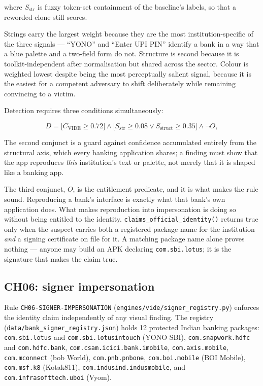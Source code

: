 \documentclass{article}
\begin{document}
where $S_{\mathrm{str}}$ is fuzzy token-set containment of the baseline's
labels, so that a reworded clone still scores.

Strings carry the largest weight because they are the most institution-specific
of the three signals --- ``YONO'' and ``Enter UPI PIN'' identify a bank in a way
that a blue palette and a two-field form do not. Structure is second because it
is toolkit-independent after normalisation but shared across the sector. Colour
is weighted lowest despite being the most perceptually salient signal, because
it is the easiest for a competent adversary to shift deliberately while
remaining convincing to a victim.

Detection requires three conditions simultaneously:

\begin{equation}
D = \big[C_{\mathrm{VIDE}} \ge 0.72\big] \wedge
    \big[S_{\mathrm{str}} \ge 0.08 \vee S_{\mathrm{struct}} \ge 0.35\big] \wedge
    \neg O,
\label{eq:vide-detect}
\end{equation}

The second conjunct is a guard against confidence accumulated entirely from the
structural axis, which every banking application shares; a finding must show
that the app reproduces \emph{this} institution's text or palette, not merely
that it is shaped like a banking app.

The third conjunct, $O$, is the entitlement predicate, and it is what makes the
rule sound. Reproducing a bank's interface is exactly what that bank's own
application does. What makes reproduction into impersonation is doing so without
being entitled to the identity. \texttt{claims\_official\_identity()} returns
true only when the suspect carries both a registered package name for the
institution \emph{and} a signing certificate on file for it. A matching package
name alone proves nothing --- anyone may build an APK declaring
\texttt{com.sbi.lotus}; it is the signature that makes the claim true.

\subsection{CH06: signer impersonation}
\label{ssec:ch06}

Rule \texttt{CH06-SIGNER-IMPERSONATION}
(\texttt{engines/vide/signer\_registry.py}) enforces the identity claim
independently of any visual finding. The registry
(\texttt{data/bank\_signer\_registry.json}) holds 12 protected Indian banking
packages: \texttt{com.sbi.lotus} and \texttt{com.sbi.lotusintouch} (YONO SBI),
\texttt{com.snapwork.hdfc} and \texttt{com.hdfc.bank},
\texttt{com.csam.icici.bank.imobile}, \texttt{com.axis.mobile},
\texttt{com.mconnect} (bob World), \texttt{com.pnb.pnbone},
\texttt{com.boi.mobile} (BOI Mobile), \texttt{com.msf.k8} (Kotak811),
\texttt{com.indusind.indusmobile}, and \texttt{com.infrasofttech.uboi} (Vyom).
\end{document}
